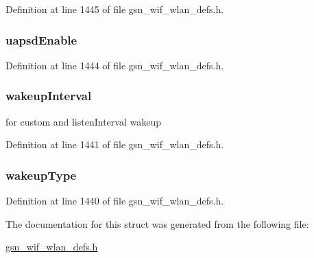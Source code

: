 Definition at line 1445 of file gsn\_\-wif\_\-wlan\_\-defs.h.

\hypertarget{a00403_a71c457b31793597927c3328c41dcdbf9}{
\subsubsection[{uapsdEnable}]{ {\bf uapsdEnable}}}
\label{a00403_a71c457b31793597927c3328c41dcdbf9}


Definition at line 1444 of file gsn\_\-wif\_\-wlan\_\-defs.h.

\hypertarget{a00403_a56221693a7df4c537eabf8d87ac56502}{
\subsubsection[{wakeupInterval}]{ {\bf wakeupInterval}}}
\label{a00403_a56221693a7df4c537eabf8d87ac56502}
for custom and listenInterval wakeup 

Definition at line 1441 of file gsn\_\-wif\_\-wlan\_\-defs.h.

\hypertarget{a00403_a475515ef82e53f18ec9a6b2acd649d5e}{
\subsubsection[{wakeupType}]{ {\bf wakeupType}}}
\label{a00403_a475515ef82e53f18ec9a6b2acd649d5e}


Definition at line 1440 of file gsn\_\-wif\_\-wlan\_\-defs.h.



The documentation for this struct was generated from the following file:\begin{DoxyCompactItemize}
\item 
\hyperlink{a00613}{gsn\_\-wif\_\-wlan\_\-defs.h}\end{DoxyCompactItemize}
